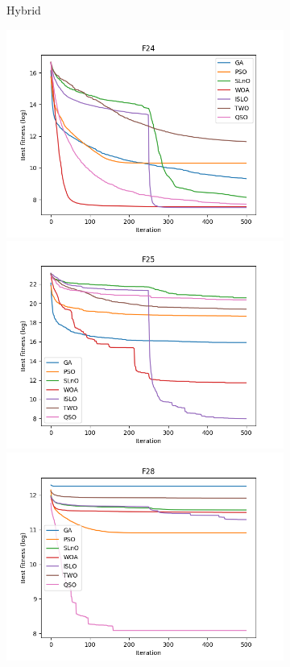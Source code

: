 \documentclass[a4paper,13pt,2p]{report}
\begin{document}
\begin{figure}[!ht]
\begin{subfigure}{0.49\textwidth}
  	\caption{Hybrid}
  	\label{subfig:hybrid_convergence}
  	\end{subfigure}
   \begin{subfigure}{0.49\textwidth}
   	\includegraphics[width=1\linewidth]{png/convergence/islo_compos_F24}
  	 \includegraphics[width=1\linewidth]{png/convergence/islo_compos_F25}
  	 \includegraphics[width=1\linewidth]{png/convergence/islo_compos_F28}

\end{subfigure}
\end{figure}
\end{document}

